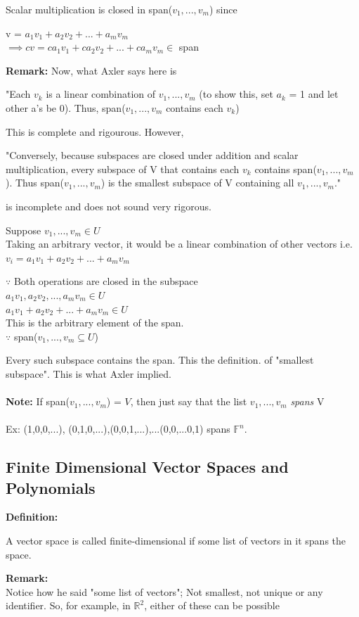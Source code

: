 \documentclass{article}
\begin{document}
Scalar multiplication is closed in span($v_1,...,v_m$) since
\begin{center}
    v = $a_1v_1+a_2v_2+...+a_mv_m$ \\
    $\implies cv = ca_1v_1+ca_2v_2+...+ca_mv_m \in$ span
\end{center}
\textbf{Remark:} Now, what Axler says here is
\begin{center}
    "Each $v_k$ is a linear combination of $v_1,...,v_m$ (to show this, set $a_k$ = 1 and let other a's be 0). Thus, span($v_1,...,v_m$ contains each $v_k$)
\end{center}
This is complete and rigourous. However, 
\begin{center}
    "Conversely, because subspaces are closed under addition and scalar multiplication, every subspace of V that contains each $v_k$ contains span($v_1,...,v_m$). Thus span($v_1,...,v_m$) is the smallest subspace of V containing all $v_1,...,v_m$."
\end{center}
is incomplete and does not sound very rigorous. 
\begin{center}
    Suppose $v_1,...,v_m \in U$ \\
    Taking an arbitrary vector, it would be a linear combination of other vectors i.e. $v_i = a_1v_1+a_2v_2+...+a_mv_m$ 

    $\because$ Both operations are closed in the subspace \\
    $a_1v_1,a_2v_2,...,a_mv_m \in U$ \\
    $a_1v_1+a_2v_2+...+a_mv_m \in U$ \\
    This is the arbitrary element of the span. \\
    $\because$ span($v_1,...,v_m \subseteq U$)
\end{center}
Every such subspace contains the span. This the definition. of "smallest subspace". This is what Axler implied. \\
\\
\textbf{Note:} If span($v_1,...,v_m$) = $V$, then just say that the list $v_1,...,v_m$ \textit{spans} V \\
\\
Ex: (1,0,0,...), (0,1,0,...),(0,0,1,...),...(0,0,...0,1) spans $\mathbb{F}^n$. 
\subsection{Finite Dimensional Vector Spaces and Polynomials}
\textbf{Definition:}
\begin{center}
    A vector space is called finite-dimensional if some list of vectors in it spans the space.
\end{center}
\textbf{Remark:} \\
Notice how he said "some list of vectors"; Not smallest, not unique or any identifier. So, for example, in $\mathbb{R}^2$, either of these can be possible
\end{document}
